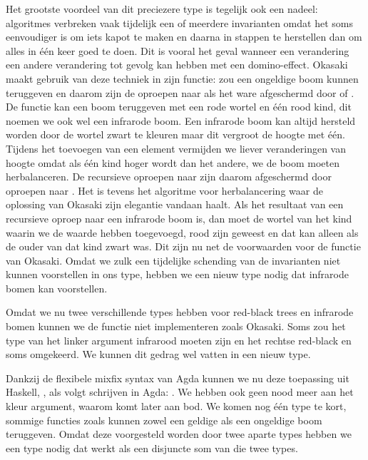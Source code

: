 Het grootste voordeel van dit preciezere type is tegelijk ook een nadeel:
algoritmes verbreken vaak tijdelijk een of meerdere invarianten omdat het soms
eenvoudiger is om iets kapot te maken en daarna in stappen te herstellen dan om
alles in één keer goed te doen. Dit is vooral het geval wanneer een verandering
een andere verandering tot gevolg kan hebben met een domino-effect. Okasaki
maakt gebruik van deze techniek in zijn  functie:  zou
een ongeldige boom kunnen teruggeven en daarom zijn de oproepen naar
 als het ware afgeschermd door  of .
De  functie kan een boom teruggeven met een rode wortel en één rood
kind, dit noemen we ook wel een infrarode boom. Een infrarode boom kan altijd
hersteld worden door de wortel zwart te kleuren maar dit vergroot de hoogte met
één. Tijdens het toevoegen van een element vermijden we liever veranderingen
van hoogte omdat als één kind hoger wordt dan het andere, we de boom moeten
herbalanceren. De recursieve oproepen naar  zijn daarom afgeschermd
door oproepen naar . Het is tevens het algoritme voor
herbalancering waar de oplossing van Okasaki zijn elegantie vandaan haalt. Als
het resultaat van een recursieve oproep naar  een infrarode boom is,
dan moet de wortel van het kind waarin we de waarde hebben toegevoegd, rood
zijn geweest en dat kan alleen als de ouder van dat kind zwart was. Dit zijn nu
net de voorwaarden voor de  functie van Okasaki. Omdat we zulk
een tijdelijke schending van de invarianten niet kunnen voorstellen in ons
 type, hebben we een nieuw type nodig dat infrarode bomen kan
voorstellen.


Omdat we nu twee verschillende types hebben voor red-black trees en infrarode
bomen kunnen we de  functie niet implementeren zoals Okasaki.
Soms zou het type van het linker argument infrarood moeten zijn en het rechtse
red-black en soms omgekeerd. We kunnen dit gedrag wel vatten in een nieuw type.


Dankzij de flexibele mixfix syntax van Agda kunnen we nu deze toepassing uit
Haskell, , als volgt schrijven in Agda:
. We hebben ook geen nood meer aan het kleur
argument, waarom komt later aan bod.
We komen nog één type te kort, sommige functies zoals  kunnen zowel
een geldige als een ongeldige boom teruggeven. Omdat deze voorgesteld worden
door twee aparte types hebben we een type nodig dat werkt als een disjuncte
som van die twee types.


